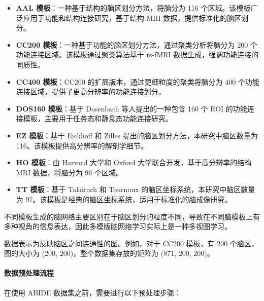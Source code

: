 \documentclass[12pt,a4paper]{article}
\begin{document}
\begin{itemize}
\item \textbf{AAL 模板}：一种基于结构的脑区划分方法，将脑分为 116 个区域\cite{tzourio2002automated}。该模板广泛应用于功能和结构连接研究，基于结构 MRI 数据，提供标准化的脑区划分。

\item \textbf{CC200 模板}：一种基于功能的脑区划分方法，通过聚类分析将脑分为 200 个功能连接区域\cite{craddock2012whole}。该模板通过聚类算法基于 rs-fMRI 数据生成，强调功能连接的同质性。

\item \textbf{CC400 模板}：CC200 的扩展版本\cite{craddock2012whole}，通过更细粒度的聚类将脑分为 400 个功能连接区域，提供了更高分辨率的功能连接划分。

\item \textbf{DOS160 模板}：基于 Dosenbach 等人提出的一种包含 160 个 ROI 的功能连接模板\cite{dosenbach2010prediction}，主要用于任务态和静息态功能连接研究。

\item \textbf{EZ 模板}：基于 Eickhoff 和 Zilles 提出的脑区划分方法\cite{eickhoff2005new}，本研究中脑区数量为 116。该模板提供高分辨率的解剖学细节。

\item \textbf{HO 模板}：由 Harvard 大学和 Oxford 大学联合开发，基于高分辨率的结构 MRI 数据，将脑分为 96 个区域\cite{desikan2006automated}。

\item \textbf{TT 模板}：基于 Talairach 和 Tournoux 的脑区坐标系统\cite{lancaster2007bias}，本研究中脑区数量为 97。该模板是经典的脑区坐标系统，适用于标准化的脑成像研究。
\end{itemize}

不同模板生成的脑网络主要区别在于脑区划分的粒度不同，导致在不同脑模板上有多种视角的信息表达，因此多模版脑网络学习实际上是一种多视图学习。

数据表示为反映脑区之间连通性的图。例如，对于 CC200 模板，有 200 个脑区，图的大小为 (200, 200)，整个数据集存放的矩阵为 (871, 200, 200)。

\paragraph{数据预处理流程}
在使用 ABIDE 数据集之前，需要进行以下预处理步骤：
\end{document}
